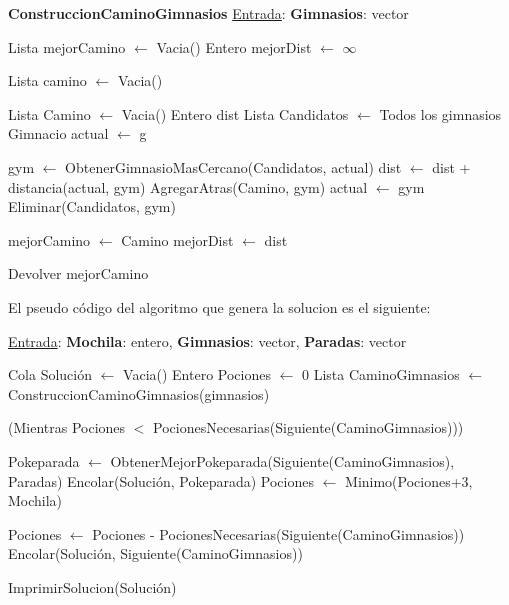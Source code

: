 \begin{algorithm}[H]
\begin{algorithmic}
\Statex \textbf{ConstruccionCaminoGimnasios} \underline{Entrada}: \textbf{Gimnasios}: vector

\State Lista mejorCamino $\leftarrow$ Vacia()
\State Entero mejorDist $\leftarrow$ $\infty$


	\State Lista camino $\leftarrow$ Vacia()

	\State Lista Camino $\leftarrow$ Vacia()
	\State Entero dist
	\State Lista Candidatos $\leftarrow$ Todos los gimnasios
	\State Gimnacio actual $\leftarrow$ g

		\State gym $\leftarrow$ ObtenerGimnasioMasCercano(Candidatos, actual)
		\State dist $\leftarrow$ dist + distancia(actual, gym)
		\State AgregarAtras(Camino, gym)
		\State actual $\leftarrow$ gym
		\State Eliminar(Candidatos, gym)

	\EndWhile


		\State mejorCamino $\leftarrow$ Camino
		\State mejorDist $\leftarrow$ dist

	\EndIf

\EndFor

\State Devolver mejorCamino

\medskip
\Statex \underline{}
\end{algorithmic}
\end{algorithm}

El pseudo código del algoritmo que genera la solucion es el siguiente:

\begin{algorithm}[H]
\label{}
\caption{}
\begin{algorithmic}[1]
\Statex \underline{Entrada}: \textbf{Mochila}: entero, \textbf{Gimnasios}: vector, \textbf{Paradas}: vector

\State Cola Solución $\leftarrow$ Vacia()
\State Entero Pociones $\leftarrow$ 0
\State Lista CaminoGimnasios $\leftarrow$ ConstruccionCaminoGimnasios(gimnasios)


	\While(Mientras Pociones $<$ PocionesNecesarias(Siguiente(CaminoGimnasios)))

		\State Pokeparada $\leftarrow$ ObtenerMejorPokeparada(Siguiente(CaminoGimnasios), Paradas)
		\State Encolar(Solución, Pokeparada)
		\State Pociones $\leftarrow$ Minimo(Pociones+3, Mochila)

	\EndWhile

	\State Pociones $\leftarrow$ Pociones - PocionesNecesarias(Siguiente(CaminoGimnasios))
	Encolar(Solución, Siguiente(CaminoGimnasios))

\EndWhile

\State ImprimirSolucion(Solución)

\medskip
\Statex \underline{}
\end{algorithmic}
\end{algorithm}


